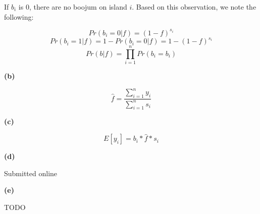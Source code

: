 \documentclass[11pt,letterpaper]{article}
\renewcommand{\part}[1] {\vspace{.10in} {\bf (#1)}}
\begin{document}
If $b_i$ is 0, there are no boojum on island $i$. Based on this observation, we note the following:

$$Pr(b_i = 0| f) = (1-f)^{s_i}$$
$$Pr(b_i = 1| f) = 1 - Pr(b_i = 0 | f) = 1 - (1-f)^{s_i}$$
$$Pr(b | f) = \prod_{i=1}^n Pr(b_i = b_i)$$

\part{b}

$$\hat{f} = \frac{\sum_{i=1}^n y_i}{\sum_{i=1}^n s_i} $$

\part{c}

$$E[y_i] = b_i * \hat{f} * s_i$$

\part{d}

Submitted online

\part{e}

TODO
\end{document}
